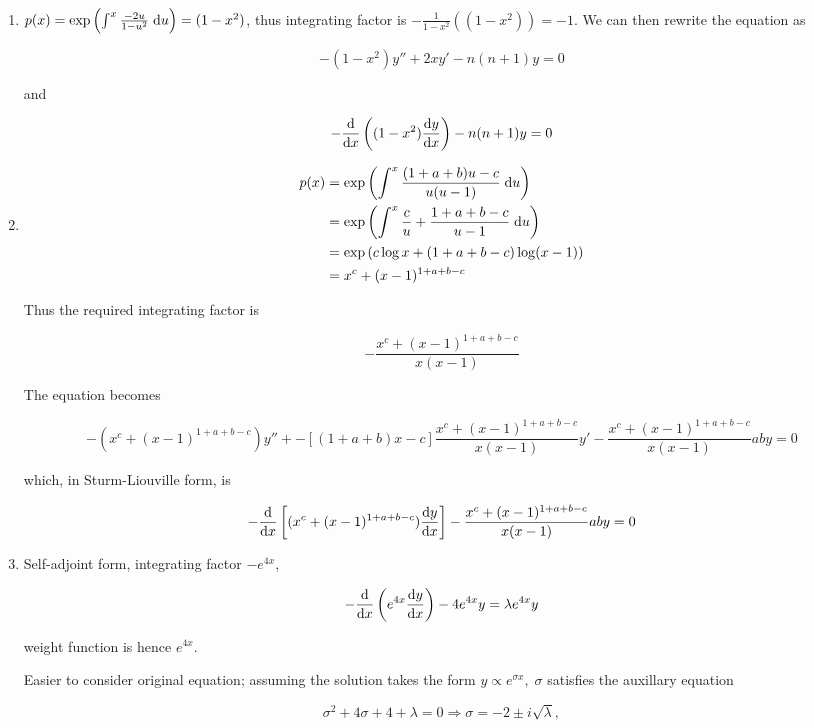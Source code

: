 \documentclass[a4paper]{article}
\begin{document}
\begin{enumerate}
	\item $ p(x) = \exp \left(  \int^{x} \frac{-2u}{1-u^{2}} \; \mathrm{d} u \right) = (1-x^{2}) $, thus integrating factor is $ -\frac{1}{1-x^{2}} \left( (1-x^{2}) \right) = -1   $. We can then rewrite the equation as
	
	\[ -(1-x^{2})y'' + 2x y' - n(n+1) y = 0  \] 
	
	and
	
	\[ -\frac{\mathrm{d} }{\mathrm{d} x} \left( (1-x^{2}) \frac{\mathrm{d} y}{\mathrm{d} x} \right) - n(n+1)y = 0  \]
	
	\item
	
	
	\begin{align*}
	p(x) & = \exp \left(  \int^{x} \frac{(1+a+b)u - c}{u(u-1)} \; \mathrm{d} u \right) \\
	& = \exp \left(  \int^{x} \frac{c}{u} + \frac{1 + a + b - c}{u-1} \; \mathrm{d} u \right) \\
	& = \exp \left(  c \log x + (1 + a + b - c)\log (x-1)  \right) \\
	& = x^{c} + (x-1)^{1 + a + b - c}
	\end{align*}
	
	Thus the required integrating factor is 
	
	\[ - \frac{x^{c} + (x-1)^{1 + a + b - c}}{x(x-1)} \]
	
	The equation becomes
	
	\[ - (x^{c} + (x-1)^{1 + a + b - c}) y''  + -[ (1 + a + b)x - c ] \frac{x^{c} + (x-1)^{1 + a + b - c}}{x(x-1)} y' - \frac{x^{c} + (x-1)^{1 + a + b - c}}{x(x-1)} ab y = 0 \]
	
	which, in Sturm-Liouville form, is 
	
	\[ -\frac{\mathrm{d} }{\mathrm{d} x} \left[  (x^{c} + (x-1)^{1 + a + b - c}) \frac{\mathrm{d} y }{\mathrm{d} x} \right] - \frac{x^{c} + (x-1)^{1 + a + b - c}}{x(x-1)} ab y = 0  \]
	
	\item Self-adjoint form, integrating factor $ - e^{4x} $, 
	
	\[ - \frac{\mathrm{d} }{\mathrm{d} x} \left( e^{4x} \frac{\mathrm{d} y}{\mathrm{d} x} \right) -4e^{4x} y = \lambda e^{4x} y \]
	
	weight function is hence $ e^{4x} $.
	
	Easier to consider original equation; assuming the solution takes the form $ y \propto e^{\sigma x}, \; \sigma $ satisfies the auxillary equation
	
	\[ \sigma^{2} + 4 \sigma + 4 + \lambda = 0 \Rightarrow \sigma = -2 \pm i\sqrt{\lambda}, \]
	

\end{enumerate}
\end{document}

